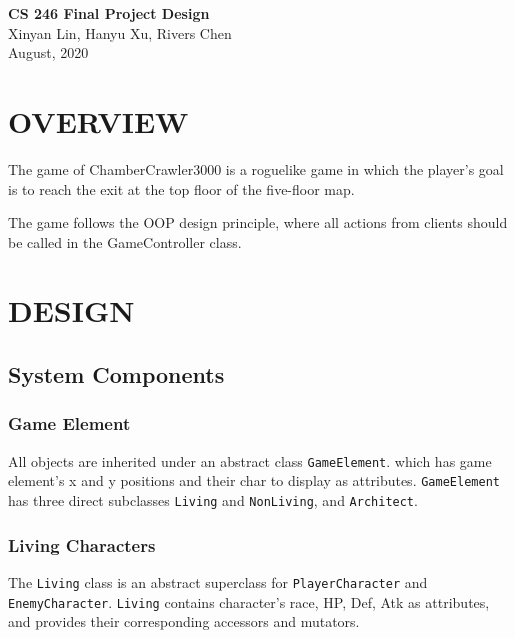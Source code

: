 \documentclass[11pt]{article}
\theoremstyle{plain} \newtheorem{theorem*}{Theorem}[subsection]
\begin{document}
\begin{center} {\LARGE \textbf{CS 246 Final Project Design}}\\ \vspace{0.15 in}
Xinyan Lin, Hanyu Xu, Rivers Chen\\ \vspace{0.07 in} August, 2020 \end{center}

\vspace{0.3 in} 
\section{OVERVIEW} 

The game of ChamberCrawler3000 is a
roguelike game in which the player’s goal is to reach the exit at the top floor
of the five-floor map.  

The game follows the OOP design principle, where all actions from clients
should be called in the GameController class.  \\

\section{DESIGN} \subsection{System Components}

\subsubsection{Game Element}

All objects are inherited under an abstract class \texttt{GameElement}. which
has game element's x and y positions and their char to display as attributes.
\texttt{GameElement} has three direct subclasses \texttt{Living} and
\texttt{NonLiving}, and \texttt{Architect}.


\subsubsection{Living Characters}

The \texttt{Living} class is an abstract superclass for
\texttt{PlayerCharacter} and \texttt{EnemyCharacter}.  \texttt{Living} contains
character's race, HP, Def, Atk as attributes, and provides their corresponding
accessors and mutators.
\end{document}
